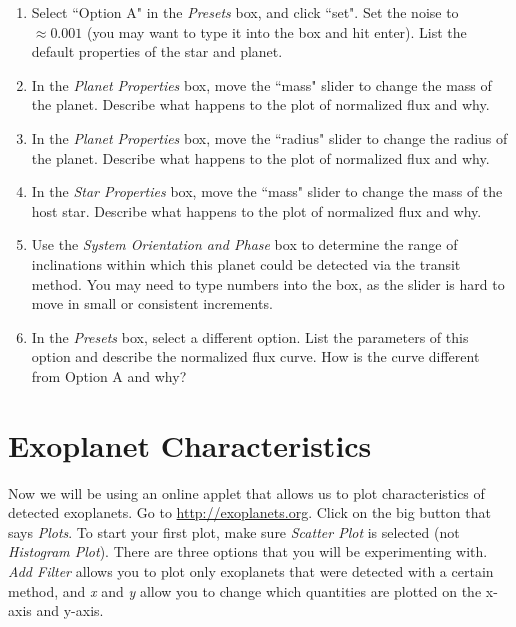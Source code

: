 \documentclass[11pt]{article}%
\begin{document}
\begin{enumerate}
\item Select ``Option A" in the \emph{Presets} box, and click ``set".  Set the noise to $\approx 0.001$ (you may want to type it into the box and hit enter).  List the default properties of the star and planet. 
\item In the \emph{Planet Properties} box, move the ``mass" slider to change the mass of the planet.  Describe what happens to the plot of normalized flux and why.
\item In the \emph{Planet Properties} box, move the ``radius" slider to change the radius of the planet.  Describe what happens to the plot of normalized flux and why.
\item In the \emph{Star Properties} box, move the ``mass" slider to change the mass of the host star.  Describe what happens to the plot of normalized flux and why.
\item Use the \emph{System Orientation and Phase} box to determine the range of inclinations within which this planet could be detected via the transit method.  You may need to type numbers into the box, as the slider is hard to move in small or consistent increments.
\item In the \emph{Presets} box, select a different option.  List the parameters of this option and describe the normalized flux curve.  How is the curve different from Option A and why?
\end{enumerate}

\section{Exoplanet Characteristics}

\noindent Now we will be using an online applet that allows us to plot characteristics of detected exoplanets.  Go to \url{http://exoplanets.org}.  Click on the big button that says \emph{Plots}.  To start your first plot, make sure \emph{Scatter Plot} is selected (not \emph{Histogram Plot}).  There are three options that you will be experimenting with.  \emph{Add Filter} allows you to plot only exoplanets that were detected with a certain method, and \emph{x} and \emph{y} allow you to change which quantities are plotted on the x-axis and y-axis.
\end{document}
